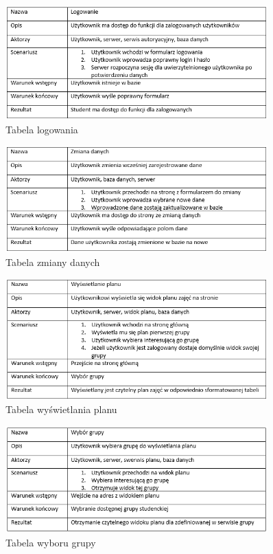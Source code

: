 \documentclass[a4paper,11pt]{uzreport}
\begin{document}
     \begin{figure}[ht!]
        \centering
        \includegraphics[width=0.9\textwidth]{pictures/logowanie.PNG}
        \caption{Tabela logowania}
        \label{fig5}
     \end{figure}

     \begin{figure}[ht!]
        \centering
        \includegraphics[width=0.9\textwidth]{pictures/zmiana danych.PNG}
        \caption{Tabela zmiany danych}
        \label{fig6}
     \end{figure}

     \begin{figure}[ht!]
        \centering
        \includegraphics[width=0.9\textwidth]{pictures/wyswietlanie planu.PNG}
        \caption{Tabela wyświetlania planu}
        \label{fig7}
     \end{figure}

     \begin{figure}[ht!]
        \centering
        \includegraphics[width=0.9\textwidth]{pictures/wybor grupy.PNG}
        \caption{Tabela wyboru grupy}
        \label{fig8}
     \end{figure}
\end{document}
